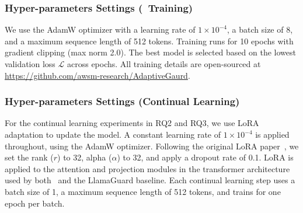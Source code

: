 


\subsubsection{Hyper-parameters Settings (\ourapp~Training)}
We use the AdamW optimizer with a learning rate of $1 \times 10^{-4}$, a batch size of 8, and a maximum sequence length of 512 tokens. Training runs for 10 epochs with gradient clipping (max norm 2.0). The best model is selected based on the lowest validation loss $\mathcal{L}$ across epochs. All training details are open-sourced at \url{https://github.com/awsm-research/AdaptiveGaurd}.

\subsubsection{Hyper-parameters Settings (Continual Learning)}
For the continual learning experiments in RQ2 and RQ3, we use LoRA adaptation to update the model. A constant learning rate of $1 \times 10^{-4}$ is applied throughout, using the AdamW optimizer. Following the original LoRA paper~\cite{hu2022lora}, we set the rank ($r$) to 32, alpha ($\alpha$) to 32, and apply a dropout rate of 0.1.
LoRA is applied to the attention and projection modules in the transformer architecture used by both \ourapp~and the LlamaGuard baseline. Each continual learning step uses a batch size of 1, a maximum sequence length of 512 tokens, and trains for one epoch per batch.
